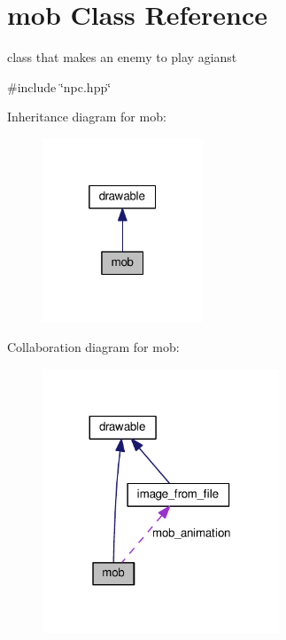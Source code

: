 \hypertarget{classmob}{}\section{mob Class Reference}
\label{classmob}


class that makes an enemy to play agianst  




{\ttfamily \#include \char`\"{}npc.\+hpp\char`\"{}}



Inheritance diagram for mob\+:\nopagebreak
\begin{figure}[H]
\begin{center}
\leavevmode
\includegraphics[width=136pt]{classmob__inherit__graph}
\end{center}
\end{figure}


Collaboration diagram for mob\+:\nopagebreak
\begin{figure}[H]
\begin{center}
\leavevmode
\includegraphics[width=200pt]{classmob__coll__graph}
\end{center}
\end{figure}
